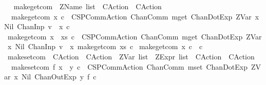 \begin{isabellebody}
\ \isanewline
{}\isamarkupfalse%
\ make{\isacharunderscore}get{\isacharunderscore}com\ {\isacharcolon}{\isacharcolon}\ {\isachardoublequoteopen}ZName\ list\ {\isasymRightarrow}\ CAction\ {\isasymRightarrow}\ CAction{\isachardoublequoteclose}\isanewline
{}\isanewline
\ \ {\isachardoublequoteopen}make{\isacharunderscore}get{\isacharunderscore}com\ {\isacharbrackleft}x{\isacharbrackright}\ c\ {\isacharequal}\ {\isacharparenleft}CSPCommAction\ {\isacharparenleft}ChanComm\ {\isacharprime}{\isacharprime}mget{\isacharprime}{\isacharprime}\ {\isacharbrackleft}ChanDotExp\ {\isacharparenleft}ZVar\ {\isacharparenleft}x{\isacharcomma}\ Nil{\isacharparenright}{\isacharparenright}{\isacharcomma}\ ChanInp\ {\isacharparenleft}{\isacharprime}{\isacharprime}v{\isacharunderscore}{\isacharprime}{\isacharprime}\ {\isacharat}\ x{\isacharparenright}{\isacharbrackright}{\isacharparenright}\ c{\isacharparenright}{\isachardoublequoteclose}\isanewline
{\isacharbar}\ {\isachardoublequoteopen}make{\isacharunderscore}get{\isacharunderscore}com\ {\isacharparenleft}x\ {\isacharhash}\ xs{\isacharparenright}\ c\ {\isacharequal}\ {\isacharparenleft}CSPCommAction\ {\isacharparenleft}ChanComm\ {\isacharprime}{\isacharprime}mget{\isacharprime}{\isacharprime}\ {\isacharbrackleft}ChanDotExp\ {\isacharparenleft}ZVar\ {\isacharparenleft}x{\isacharcomma}\ Nil{\isacharparenright}{\isacharparenright}{\isacharcomma}\ ChanInp\ {\isacharparenleft}{\isacharprime}{\isacharprime}v{\isacharunderscore}{\isacharprime}{\isacharprime}\ {\isacharat}\ x{\isacharparenright}{\isacharbrackright}{\isacharparenright}\ {\isacharparenleft}make{\isacharunderscore}get{\isacharunderscore}com\ xs\ c{\isacharparenright}{\isacharparenright}{\isachardoublequoteclose}\isanewline
{\isacharbar}\ {\isachardoublequoteopen}make{\isacharunderscore}get{\isacharunderscore}com\ x\ c\ {\isacharequal}\ c{\isachardoublequoteclose}\isanewline
\isanewline
\ \isanewline
{}\isamarkupfalse%
\ make{\isacharunderscore}set{\isacharunderscore}com\ {\isacharcolon}{\isacharcolon}\ {\isachardoublequoteopen}{\isacharparenleft}CAction\ {\isasymRightarrow}\ CAction{\isacharparenright}\ {\isasymRightarrow}\ ZVar\ list\ {\isasymRightarrow}\ ZExpr\ list\ {\isasymRightarrow}\ CAction\ {\isasymRightarrow}\ CAction{\isachardoublequoteclose}\isanewline
{}\isanewline
\ \ {\isachardoublequoteopen}make{\isacharunderscore}set{\isacharunderscore}com\ f\ {\isacharbrackleft}{\isacharparenleft}x{\isacharcomma}\ {\isacharunderscore}{\isacharparenright}{\isacharbrackright}\ {\isacharbrackleft}y{\isacharbrackright}\ c\ {\isacharequal}\ {\isacharparenleft}CSPCommAction\ {\isacharparenleft}ChanComm\ {\isacharprime}{\isacharprime}mset{\isacharprime}{\isacharprime}\ {\isacharbrackleft}ChanDotExp\ {\isacharparenleft}ZVar\ {\isacharparenleft}x{\isacharcomma}\ Nil{\isacharparenright}{\isacharparenright}{\isacharcomma}\ ChanOutExp\ y{\isacharbrackright}{\isacharparenright}\ {\isacharparenleft}f\ c{\isacharparenright}{\isacharparenright}{\isachardoublequoteclose}\isanewline

\end{isabellebody}
